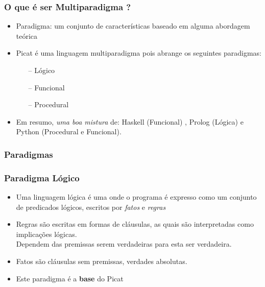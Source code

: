 
\begin{frame}[fragile]
    \frametitle{O que é ser Multiparadigma ?}

    \begin{itemize}
    
    \item Paradigma: um conjunto de características baseado em alguma abordagem teórica 
    
    \pause
      \item Picat é uma linguagem multiparadigma pois abrange os seguintes paradigmas:
    
      \begin{itemize}
      	\item[--] Lógico
      	\item[--] Funcional
      	\item[--] Procedural
      \end{itemize}
      
     \pause
      \item Em resumo,  \textit{uma boa mistura} de: Haskell (Funcional) , Prolog (Lógica) e 
      Python (Procedural e Funcional).
      
    \end{itemize}
      

\end{frame}

\subsubsection{Paradigmas}
\begin{frame}[fragile]
	\frametitle{Paradigma Lógico}
    
    \begin{itemize}
    
    	\item Uma linguagem lógica é uma onde o programa é expresso como um conjunto
        de predicados lógicos, escritos por \textit{fatos} e \textit{regras}
    
    \pause
    	\item Regras são escritas em formas de cláusulas, as quais são interpretadas como
        implicações lógicas.\\ 
        Dependem das premissas serem verdadeiras para esta ser verdadeira.
        

    \pause
    	\item Fatos são cláusulas sem premissas, verdades absolutas.

        
        \pause
        \item Este   paradigma é a  \textbf{base} do Picat
    \end{itemize}

\end{frame}


